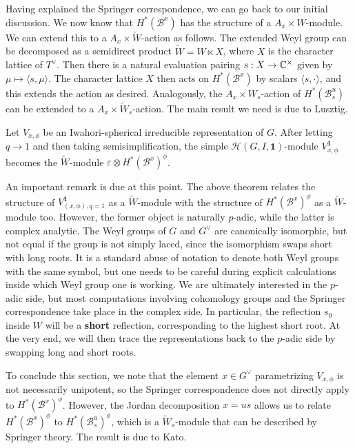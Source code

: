 Having explained the Springer correspondence, we can go back to our initial discussion. We now know that $H^*(\mathcal{B}^x)$ has the structure of a $A_x\times W$-module. We can extend this to a $A_x\times\widetilde{W}$-action as follows. The extended Weyl group can be decomposed as a semidirect product $\widetilde{W}=W\ltimes X$, where $X$ is the character lattice of $T^\vee$. Then there is a natural evaluation pairing $s:X\rightarrow \mathbb{C}^\times$ given by $\mu\mapsto\langle s,\mu\rangle$. The character lattice $X$ then acts on $H^*(\mathcal{B}^x)$ by scalars $\langle s,\cdot\rangle$, and this extends the action as desired. Analogously, the $A_x\times W_s$-action of $H^*(\mathcal{B}^u_s)$ can be extended to a $A_x\times\widetilde{W}_s$-action. The main result we need is due to Lusztig.

\begin{theorem}\label{thm:Kato_module}
    Let $V_{x,\phi}$ be an Iwahori-spherical irreducible representation of $G$. After letting $q\rightarrow 1$ and then taking semisimplification, the simple $\mathcal{H}(G,I,\mathbf{1})$-module $V^\mathbf{1}_{x,\phi}$ becomes the $\widetilde{W}$-module $\varepsilon\otimes H^*(\mathcal{B}^x)^\phi$. 
\end{theorem}

\begin{remark}\label{rem:Weylgroups}
    An important remark is due at this point. The above theorem relates the structure of $V^\mathbf{1}_{(x,\phi),q=1}$ as a $\widetilde{W}$-module with the structure of $H^*(\mathcal{B}^x)^\phi$ as a $\widetilde{W}$-module too. However, the former object is naturally $p$-adic, while the latter is complex analytic. The Weyl groups of $G$ and $G^\vee$ are canonically isomorphic, but not equal if the group is not simply laced, since the isomorphism swaps short with long roots. It is a standard abuse of notation to denote both Weyl groups with the same symbol, but one needs to be careful during explicit calculations inside which Weyl group one is working. We are ultimately interested in the $p$-adic side, but most computations involving cohomology groups and the Springer correspondence take place in the complex side. In particular, the reflection $s_0$ inside $W$ will be a \textbf{short} reflection, corresponding to the highest short root. At the very end, we will then trace the representations back to the $p$-adic side by swapping long and short roots. 
\end{remark}

To conclude this section, we note that the element $x\in G^\vee$ parametrizing $V_{x,\phi}$ is not necessarily unipotent, so the Springer correspondence does not directly apply to $H^*(\mathcal{B}^x)^\phi$. However, the Jordan decomposition $x=us$ allows us to relate $H^*(\mathcal{B}^x)^\phi$ to $H^*(\mathcal{B}_s^u)^\phi$, which is a $\widetilde{W}_s$-module that can be described by Springer theory. The result is due to Kato.

